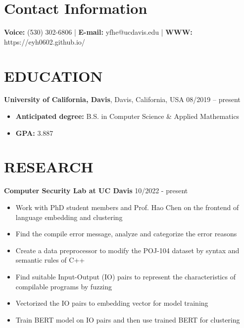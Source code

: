 \documentclass[margin,line]{res}
\begin{document}

\begin{resume}
\section{\sc Contact Information}
\vspace{.05in}
\textbf{Voice:} (530) 302-6806 |
\textbf{E-mail:} yfhe@ucdavis.edu |
\textbf{WWW:} https://eyh0602.github.io/



\section{\sc EDUCATION}
\textbf{University of California, Davis}, Davis, California, USA \hfill {08/2019 -- present} \\
\begin{itemize}
	\item \textbf{Anticipated degree:} B.S. in Computer Science \& Applied Mathematics
	\item \textbf{GPA:} 3.887
\end{itemize}

\section{\sc RESEARCH}
\textbf{Computer Security Lab at UC Davis} \hfill 10/2022 - present \\
\begin{itemize}
	\item Work with PhD student members and Prof. Hao Chen on the frontend of language embedding and clustering 
	\item Find the compile error message, analyze and categorize the error reasons 
	\item Create a data preprocessor to modify the POJ-104 dataset by syntax and semantic rules of C++ 
	\item Find suitable Input-Output (IO) pairs to represent the characteristics of compilable programs by fuzzing
	\item Vectorized the IO pairs to embedding vector for model training 
	\item Train BERT model on IO pairs and then use trained BERT for clustering 
\end{itemize}


\end{resume}
\end{document}
